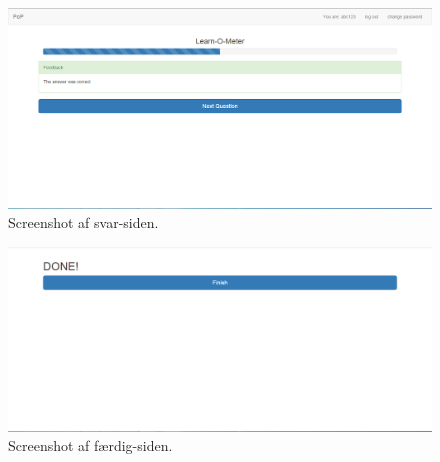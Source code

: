 \documentclass[11pt, a4paper]{article}
\begin{document}
\begin{figure}[h!]
    \centering
    \includegraphics[width=1\linewidth]{figures/interface/answer.png}
    \caption{Screenshot af svar-siden.}
    \label{fig:screenshot_answer}
\end{figure}


\begin{figure}[h!]
    \centering
    \includegraphics[width=1\linewidth]{figures/interface/finish.png}
    \caption{Screenshot af færdig-siden.}
    \label{fig:screenshot_finish}
\end{figure}
\end{document}

